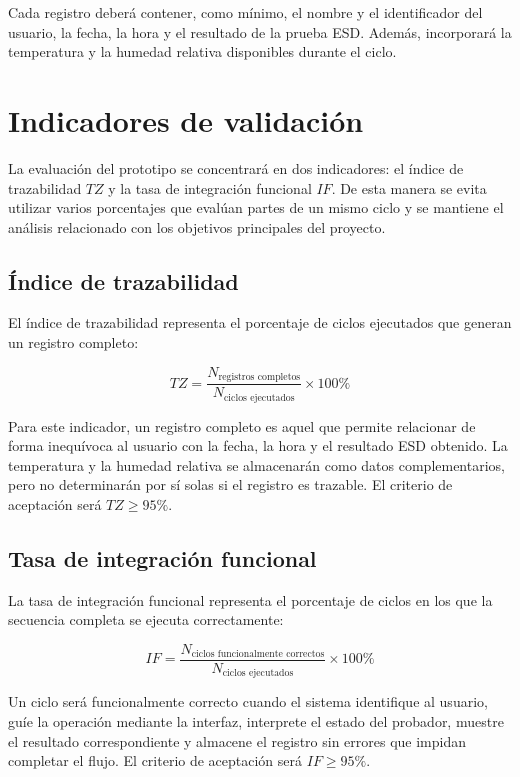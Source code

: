 Cada registro deberá contener, como mínimo, el nombre y el identificador del
usuario, la fecha, la hora y el resultado de la prueba ESD. Además, incorporará la
temperatura y la humedad relativa disponibles durante el ciclo. 

\section{Indicadores de validación}

La evaluación del prototipo se concentrará en dos indicadores: el índice de
trazabilidad \(TZ\) y la tasa de integración funcional \(IF\). De esta manera se
evita utilizar varios porcentajes que evalúan partes de un mismo ciclo y se
mantiene el análisis relacionado con los objetivos principales del proyecto.

\subsection{Índice de trazabilidad}

El índice de trazabilidad representa el porcentaje de ciclos ejecutados que
generan un registro completo:

\begin{equation}
TZ =
\frac{N_{\text{registros completos}}}
{N_{\text{ciclos ejecutados}}}
\times 100\%
\label{eq:indice_trazabilidad}
\end{equation}

Para este indicador, un registro completo es aquel que permite relacionar de
forma inequívoca al usuario con la fecha, la hora y el resultado ESD obtenido.
La temperatura y la humedad relativa se almacenarán como datos complementarios,
pero no determinarán por sí solas si el registro es trazable. El criterio de
aceptación será \(TZ \geq 95\%\).

\subsection{Tasa de integración funcional}

La tasa de integración funcional representa el porcentaje de ciclos en los que
la secuencia completa se ejecuta correctamente:

\begin{equation}
IF =
\frac{N_{\text{ciclos funcionalmente correctos}}}
{N_{\text{ciclos ejecutados}}}
\times 100\%
\label{eq:integracion_funcional}
\end{equation}

Un ciclo será funcionalmente correcto cuando el sistema identifique al usuario,
guíe la operación mediante la interfaz, interprete el estado del probador,
muestre el resultado correspondiente y almacene el registro sin errores que
impidan completar el flujo. El criterio de aceptación será \(IF \geq 95\%\).

